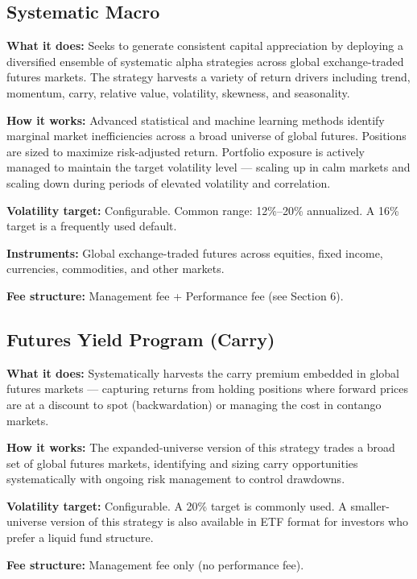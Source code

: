\documentclass{resolve-whitepaper}
\begin{document}
\subsection{Systematic Macro}\label{systematic-macro}

\textbf{What it does:} Seeks to generate consistent capital appreciation
by deploying a diversified ensemble of systematic alpha strategies
across global exchange-traded futures markets. The strategy harvests a
variety of return drivers including trend, momentum, carry, relative
value, volatility, skewness, and seasonality.

\textbf{How it works:} Advanced statistical and machine learning methods
identify marginal market inefficiencies across a broad universe of
global futures. Positions are sized to maximize risk-adjusted return.
Portfolio exposure is actively managed to maintain the target volatility
level --- scaling up in calm markets and scaling down during periods of
elevated volatility and correlation.

\textbf{Volatility target:} Configurable. Common range: 12\%--20\%
annualized. A 16\% target is a frequently used default.

\textbf{Instruments:} Global exchange-traded futures across equities,
fixed income, currencies, commodities, and other markets.

\textbf{Fee structure:} Management fee + Performance fee (see Section
6).

\subsection{Futures Yield Program
(Carry)}\label{futures-yield-program-carry}

\textbf{What it does:} Systematically harvests the carry premium
embedded in global futures markets --- capturing returns from holding
positions where forward prices are at a discount to spot (backwardation)
or managing the cost in contango markets.

\textbf{How it works:} The expanded-universe version of this strategy
trades a broad set of global futures markets, identifying and sizing
carry opportunities systematically with ongoing risk management to
control drawdowns.

\textbf{Volatility target:} Configurable. A 20\% target is commonly
used. A smaller-universe version of this strategy is also available in
ETF format for investors who prefer a liquid fund structure.

\textbf{Fee structure:} Management fee only (no performance fee).
\end{document}
